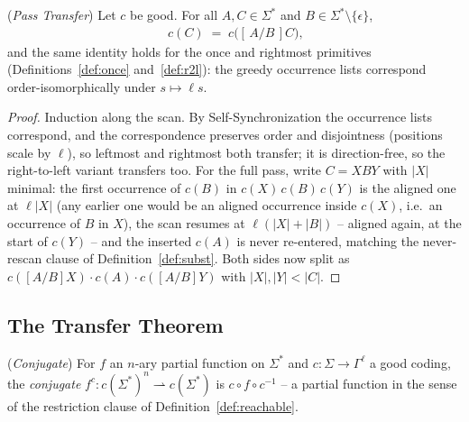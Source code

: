 \documentclass[runningheads,envcountsect]{llncs}
\begin{document}
\begin{lemma}
    (\emph{Pass Transfer})
    \label{lem:pass-transfer}
    Let $c$ be good. For all $A, C \in \Sigma^*$ and $B \in \Sigma^* \setminus \{\epsilon\}$,
    \begin{align}
        [\,c(A)/c(B)\,]\; c(C) \;=\; c\big([\,A/B\,]C\big),
    \end{align}
    and the same identity holds for the once and rightmost primitives (Definitions~\ref{def:once} and~\ref{def:r2l}): the greedy occurrence lists correspond order-isomorphically under $s \mapsto \ell s$.
\end{lemma}

\begin{proof}
    Induction along the scan. By Self-Synchronization the occurrence lists correspond, and the correspondence preserves order and disjointness (positions scale by $\ell$), so leftmost and rightmost both transfer; it is direction-free, so the right-to-left variant transfers too. For the full pass, write $C = X B Y$ with $|X|$ minimal: the first occurrence of $c(B)$ in $c(X)\,c(B)\,c(Y)$ is the aligned one at $\ell|X|$ (any earlier one would be an aligned occurrence inside $c(X)$, i.e.\ an occurrence of $B$ in $X$), the scan resumes at $\ell(|X|{+}|B|)$ -- aligned again, at the start of $c(Y)$ -- and the inserted $c(A)$ is never re-entered, matching the never-rescan clause of Definition~\ref{def:subst}. Both sides now split as $c([A/B]X) \cdot c(A) \cdot c([A/B]Y)$ with $|X|, |Y| < |C|$.
\end{proof}

\subsection{The Transfer Theorem}

\begin{definition}
    (\emph{Conjugate})
    \label{def:conjugate}
    For $f$ an $n$-ary partial function on $\Sigma^*$ and $c : \Sigma \rightarrow \Gamma^\ell$ a good coding, the \emph{conjugate} $f^c : c(\Sigma^*)^n \rightharpoonup c(\Sigma^*)$ is $c \circ f \circ c^{-1}$ -- a partial function in the sense of the restriction clause of Definition~\ref{def:reachable}.
\end{definition}
\end{document}
